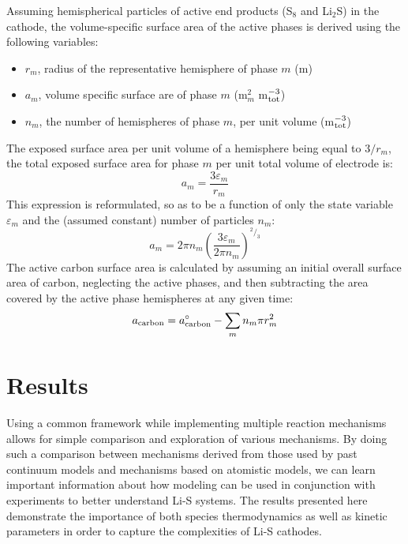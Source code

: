 \documentclass{elsarticle}
\begin{document}
Assuming hemispherical particles of active end products (S$_8$ and Li$_2$S) in the cathode, the volume-specific surface area of the active phases is derived using the following variables:
\begin{itemize}
    \item $r_m$, radius of the representative hemisphere of phase $m$ (m)
    \item $a_m$, volume specific surface are of phase $m$ (m$^2_m$ m$^{-3}_{\rm tot}$)
    \item $n_m$, the number of hemispheres of phase $m$, per unit volume (m$^{-3}_{\rm tot}$)
\end{itemize}
The exposed surface area per unit volume of a hemisphere being equal to $3/r_m$, the total exposed surface area for phase $m$ per unit total volume of electrode is:
\begin{equation}\label{eq:area_per_vol_m_1}
    a_m = \frac{3\varepsilon_m}{r_m}
\end{equation}
This expression is reformulated, so as to be a function of only the state variable $\varepsilon_m$ and the (assumed constant) number of particles $n_m$:
\begin{equation}\label{eq:area_per_vol_m_2}
    a_m = 2\pi n_m\left(\frac{3\varepsilon_m}{2\pi n_m}\right)^{^2/_3}
\end{equation}
The active carbon surface area is calculated by assuming an initial overall surface area of carbon, neglecting the active phases, and then subtracting the area covered by the active phase hemispheres at any given time:
\begin{equation}\label{eq:a_carbon}
    a_{\rm carbon} = a^\circ_{\rm carbon} - \sum_m n_m\pi r_m^2
\end{equation}





\section{Results}

Using a common framework while implementing multiple reaction mechanisms allows for simple comparison and exploration of various mechanisms. By doing such a comparison between mechanisms derived from those used by past continuum models and mechanisms based on atomistic models, we can learn important information about how modeling can be used in conjunction with experiments to better understand Li-S systems. The results presented here demonstrate the importance of both species thermodynamics as well as kinetic parameters in order to capture the complexities of Li-S cathodes. 
\end{document}
